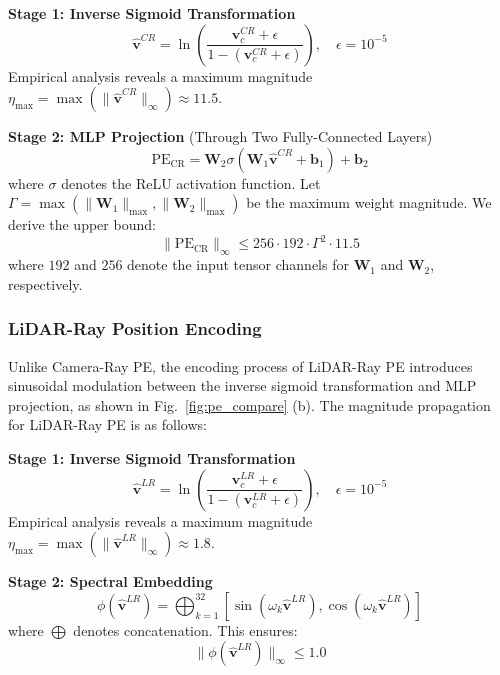 \textbf{Stage 1: Inverse Sigmoid Transformation}
\begin{equation}
    \hat{\mathbf{v}}^{CR} = \ln\left(\frac{\mathbf{v}_c^{CR} + \epsilon}{1 - (\mathbf{v}_c^{CR} + \epsilon)}\right), \quad \epsilon = 10^{-5}
    \label{eq:logit_transform_cr}
\end{equation}
Empirical analysis reveals a maximum magnitude $\eta_{\text{max}} = \max(\|\hat{\mathbf{v}}^{CR}\|_\infty) \approx 11.5$.

\textbf{Stage 2: MLP Projection} (Through Two Fully-Connected Layers)
\begin{equation}
    \text{PE}_{\text{CR}} = \mathbf{W}_2 \sigma(\mathbf{W}_1 \hat{\mathbf{v}}^{CR} + \mathbf{b}_1) + \mathbf{b}_2
    \label{eq:mlp_transform_cr}
\end{equation}
where $\sigma$ denotes the ReLU activation function. Let $\Gamma = \max(\|\mathbf{W}_1\|_{\max}, \|\mathbf{W}_2\|_{\max})$ be the maximum weight magnitude. We derive the upper bound:
\begin{equation}
    \| \text{PE}_{\text{CR}} \|_\infty \leq 256 \cdot 192 \cdot \Gamma^2 \cdot 11.5
    \label{eq:cr_bound}
\end{equation}
where $192$ and $256$ denote the input tensor channels for $\mathbf{W}_1$ and $\mathbf{W}_2$, respectively.

\subsubsection{LiDAR-Ray Position Encoding}
\label{subsubsec:lidar_pe}
Unlike Camera-Ray PE, the encoding process of LiDAR-Ray PE introduces sinusoidal modulation between the inverse sigmoid transformation and MLP projection, as shown in Fig.~\ref{fig:pe_compare} (b). The magnitude propagation for LiDAR-Ray PE is as follows:

\textbf{Stage 1: Inverse Sigmoid Transformation}
\begin{equation}
    \hat{\mathbf{v}}^{LR} = \ln\left(\frac{\mathbf{v}_c^{LR} + \epsilon}{1 - (\mathbf{v}_c^{LR} + \epsilon)}\right), \quad \epsilon = 10^{-5}
    \label{eq:logit_transform_lr}
\end{equation}
Empirical analysis reveals a maximum magnitude $\eta_{\text{max}} = \max(\|\hat{\mathbf{v}}^{LR}\|_\infty) \approx 1.8$.

\textbf{Stage 2: Spectral Embedding}
\begin{equation}
    \phi(\hat{\mathbf{v}}^{LR}) = \bigoplus_{k=1}^{32} \left[\sin(\omega_k \hat{\mathbf{v}}^{LR}), \cos(\omega_k \hat{\mathbf{v}}^{LR})\right]
    \label{eq:sinusoidal}
\end{equation}
where $\bigoplus$ denotes concatenation. This ensures:
\begin{equation}
    \| \phi(\hat{\mathbf{v}}^{LR}) \|_\infty \leq 1.0
    \label{eq:sin_bound}
\end{equation}

